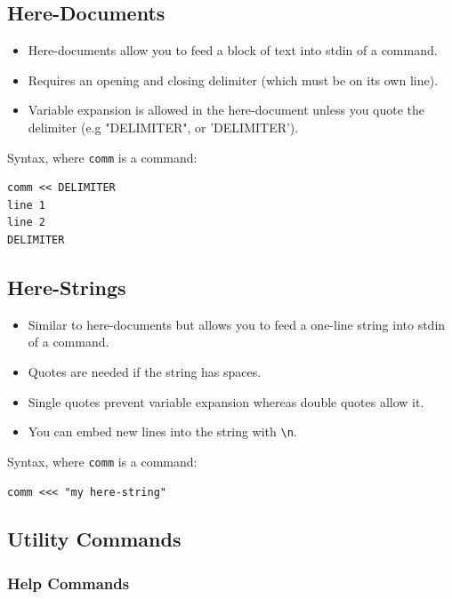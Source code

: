\documentclass{article}
\newcommand{\code}[1]{\texttt{#1}}
\begin{document}
\subsection{Here-Documents}

\begin{itemize}
    \item Here-documents allow you to feed a block of text into stdin of a command.
    \item Requires an opening and closing delimiter (which must be on its own line).
    \item Variable expansion is allowed in the here-document unless you quote the delimiter (e.g "DELIMITER", or 'DELIMITER').
\end{itemize}

Syntax, where \code{comm} is a command:

\begin{lstlisting}
comm << DELIMITER
line 1
line 2
DELIMITER
\end{lstlisting}

\subsection{Here-Strings}

\begin{itemize}
    \item Similar to here-documents but allows you to feed a one-line string into stdin of a command.
    \item Quotes are needed if the string has spaces.
    \item Single quotes prevent variable expansion whereas double quotes allow it.
    \item You can embed new lines into the string with \code{\textbackslash n}.
\end{itemize}

Syntax, where \code{comm} is a command:

\begin{lstlisting}
comm <<< "my here-string"
\end{lstlisting}

\subsection{Utility Commands}

\subsubsection{Help Commands}
\end{document}
